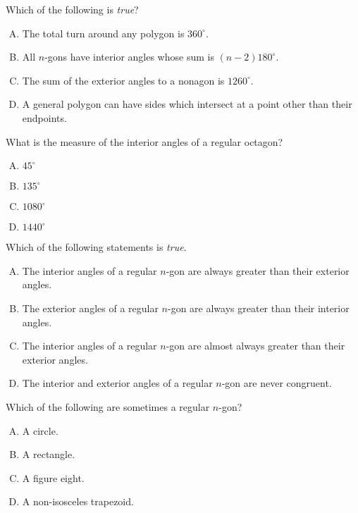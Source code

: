 \documentclass[12pt,letterpaper]{exam}
\begin{document}
\begin{questions}
\vfill



\question Which of the following is \textit{true}?
        \begin{enumerate}[A.]
        \item The total turn around any polygon is $360^\circ$.
        \item All $n$-gons have interior angles whose sum is $(n - 2)180^\circ$.
        \item The sum of the exterior angles to a nonagon is $1260^\circ$.
        \item A general polygon can have sides which intersect at a point other than their endpoints. %
        \end{enumerate}



\vfill



\question What is the measure of the interior angles of a regular octagon?
        \begin{enumerate}[A.]
        \item $45^\circ$
        \item $135^\circ$
        \item $1080^\circ$ %
        \item $1440^\circ$
        \end{enumerate}



\vfill



\question Which of the following statements is \textit{true}. 
        \begin{enumerate}[A.]
        \item The interior angles of a regular $n$-gon are always greater than their exterior angles. %
        \item The exterior angles of a regular $n$-gon are always greater than their interior angles.
        \item The interior angles of a regular $n$-gon are almost always greater than their exterior angles.
        \item The interior and exterior angles of a regular $n$-gon are never congruent. 
        \end{enumerate}



\vfill



\question Which of the following are sometimes a regular $n$-gon?
        \begin{enumerate}[A.]
        \item A circle.
        \item A rectangle. 
        \item A figure eight. %
        \item A non-isosceles trapezoid. 
        \end{enumerate}




\end{questions}
\end{document}

